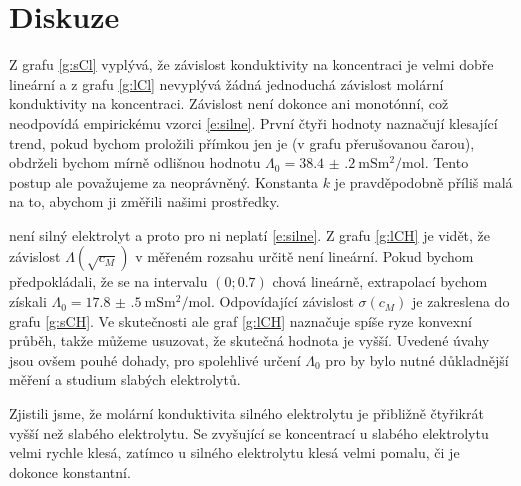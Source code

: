 \section*{Diskuze}

Z grafu \ref{g:sCl} vyplývá, že závislost konduktivity  na koncentraci je velmi dobře lineární a z grafu \ref{g:lCl} nevyplývá žádná jednoduchá závislost molární konduktivity na koncentraci.
Závislost není dokonce ani monotónní, což neodpovídá empirickému vzorci \eqref{e:silne}.
První čtyři hodnoty naznačují klesající trend, pokud bychom proložili přímkou jen je (v grafu přerušovanou čarou), obdrželi bychom mírně odlišnou hodnotu $\Lambda_0=\SI{38.4(2)}{\milli\siemens\metre\squared\per\mole}$. Tento postup ale považujeme za neoprávněný.
Konstanta $k$ je pravděpodobně příliš malá na to, abychom ji změřili našimi prostředky.

 není silný elektrolyt a proto pro ni neplatí \eqref{e:silne}. Z grafu \ref{g:lCH} je vidět, že závislost $\Lambda(\sqrt{c_M})$ v měřeném rozsahu určitě není lineární.
Pokud bychom předpokládali, že se na intervalu $\left(0;\num{0.7}\right)$ chová lineárně, extrapolací bychom získali $\Lambda_0=\SI{17.8(5)}{\milli\siemens\metre\squared\per\mole}$. Odpovídající závislost $\sigma(c_M)$ je zakreslena do grafu \ref{g:sCH}. Ve skutečnosti ale graf \ref{g:lCH} naznačuje spíše ryze konvexní průběh, takže můžeme usuzovat, že skutečná hodnota je vyšší.
Uvedené úvahy jsou ovšem pouhé dohady, pro spolehlivé určení $\Lambda_0$ pro  by bylo nutné důkladnější měření a studium slabých elektrolytů.


Zjistili jsme, že molární konduktivita silného elektrolytu je přibližně čtyřikrát vyšší než slabého elektrolytu.
Se zvyšující se koncentrací u slabého elektrolytu velmi rychle klesá, zatímco u silného elektrolytu klesá velmi pomalu, či je dokonce konstantní.